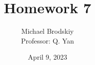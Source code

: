 


\title{Homework 7}
\date{April 9, 2023}
\author{Michael Brodskiy\\ \small Professor: Q. Yan}



\maketitle

\newpage

